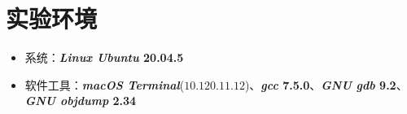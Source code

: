 \section{实验环境}
    \begin{itemize}
        \item 系统：\textbf{\textit{Linux Ubuntu} 20.04.5} 
        \item 软件工具：\textbf{\textit{macOS Terminal}}($10.120.11.12$)、\textbf{\textit{gcc} 7.5.0}、\textbf{\textit{GNU gdb} 9.2}、\textbf{\textit{GNU objdump} 2.34}
    \end{itemize}